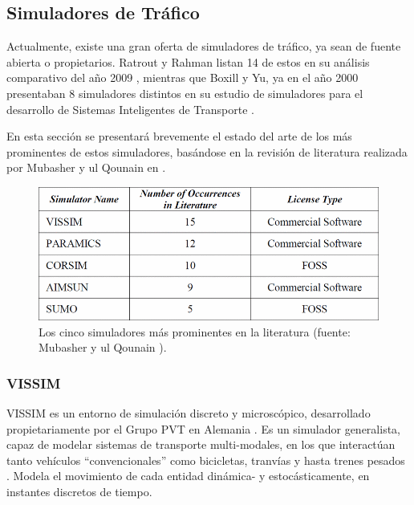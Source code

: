 \subsection{Simuladores de Tráfico}

Actualmente, existe una gran oferta de simuladores de tráfico, ya sean de fuente abierta o propietarios. Ratrout y Rahman listan 14 de estos en su análisis comparativo del año 2009 \autocite{ratrout2009comparative}, mientras que Boxill y Yu, ya en el año 2000 presentaban 8 simuladores distintos en su estudio de simuladores para el desarrollo de Sistemas Inteligentes de Transporte \autocite{boxill2000evaluation}.

En esta sección se presentará brevemente el estado del arte de los más prominentes de estos simuladores, basándose en la revisión de literatura realizada por Mubasher y ul Qounain en \autocite{traffic_sim_review}.

\begin{figure}
    \centering
    \includegraphics[width=\linewidth]{figuras/popular_trafficsims}
    \caption{Los cinco simuladores más prominentes en la literatura (fuente: Mubasher y ul Qounain \autocite{traffic_sim_review}).}
    \label{fig:prom_trafficsim}
\end{figure}

\subsubsection{VISSIM}

VISSIM es un entorno de simulación discreto y microscópico, desarrollado propietariamente por el Grupo PVT en Alemania \autocite{vissim}. Es un simulador generalista, capaz de modelar sistemas de transporte multi-modales, en los que interactúan tanto vehículos ``convencionales'' como bicicletas, tranvías y hasta trenes pesados \autocite{fellendorf2010microscopic}. Modela el movimiento de cada entidad dinámica- y estocásticamente, en instantes discretos de tiempo. 

